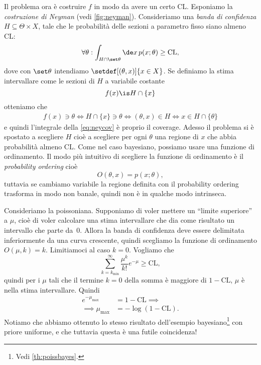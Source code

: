 Il problema ora è costruire $f$ in modo da avere un certo $\mathrm{CL}$.
Esponiamo la \emph{costruzione di Neyman} (vedi \autoref{fig:neyman}).
Consideriamo una \emph{banda di confidenza} $H\subseteq \Theta\times X$,
tale che le probabilità delle sezioni a parametro fisso siano almeno $\mathrm{CL}$:
\begin{equation}
	\label{eq:neycov}
	\forall\theta:
	\int_{H\cap\set\theta} \de x\, p(x;\theta) \ge \mathrm{CL},
\end{equation}
dove con $\set\theta$ intendiamo $\setdef[(\theta,x)]{x\in X}$.
Se definiamo la stima intervallare come le sezioni di $H$ a variabile costante
\begin{equation*}
	f(x) \is H \cap \{x\}
\end{equation*}
otteniamo che
\begin{align*}
	f(x)\ni\theta
	\iff
	H \cap \{x\} \ni \theta
	\iff
	(\theta,x) \in H
	\iff
	x \in H \cap \{\theta\}
\end{align*}
e quindi l'integrale della \eqref{eq:neycov} è proprio il coverage.
Adesso il problema si è spostato a scegliere $H$
cioè a scegliere per ogni $\theta$ una regione di $x$ che abbia probabilità almeno $\mathrm{CL}$.
Come nel caso bayesiano, possiamo usare una funzione di ordinamento.
Il modo più intuitivo di scegliere la funzione di ordinamento è il \emph{probability ordering} cioè
\begin{equation*}
	O(\theta,x) = p(x;\theta),
\end{equation*}
tuttavia se cambiamo variabile la regione definita con il probability ordering trasforma in modo non banale,
quindi non è in qualche modo intrinseca.

\begin{example}
	\label{th:poisssup}
	Consideriamo la poissoniana.
	Supponiamo di voler mettere un ``limite superiore'' a $\mu$,
	cioè di voler calcolare una stima intervallare che dia come risultato un intervallo che parte da~0.
	Allora la banda di confidenza deve essere delimitata inferiormente da una curva crescente,
	quindi scegliamo la funzione di ordinamento $O(\mu,k)=k$.
	Limitiamoci al caso $k=0$.
	Vogliamo che
	\begin{equation*}
		\sum_{k=k_\mathrm{min}}^\infty \frac{\mu^k}{k!}e^{-\mu} \ge \mathrm{CL},
	\end{equation*}
	quindi per i $\mu$ tali che il termine $k=0$ della somma è maggiore di $1-\mathrm{CL}$,
	$\mu$ è nella stima intervallare.
	Quindi
	\begin{align*}
		e^{-\mu_\mathrm{max}}
		&= 1 - \mathrm{CL} \implies \\
		\implies \mu_\mathrm{\max}
		&= -\log(1-\mathrm{CL}).
	\end{align*}
	Notiamo che abbiamo ottenuto lo stesso risultato dell'esempio bayesiano\footnote{Vedi \autoref{th:poissbayes}.} con priore uniforme,
	e che tuttavia questa è una futile coincidenza!
\end{example}

